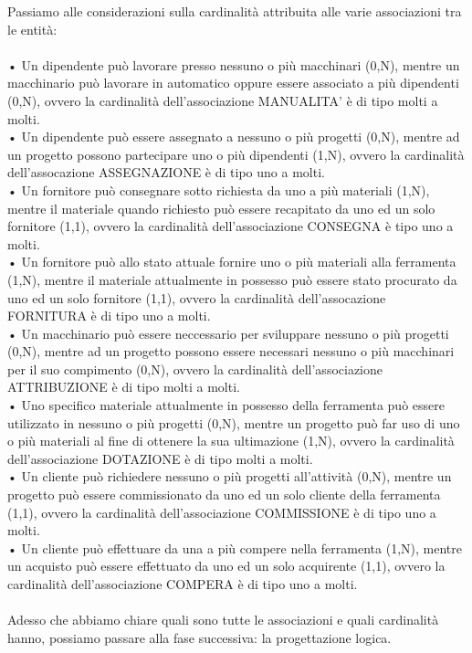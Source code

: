 \documentclass[a4paper,12pt,italian]{article}
\begin{document}
Passiamo alle considerazioni sulla cardinalità attribuita alle varie associazioni tra le entità:  \\ \\
• Un dipendente può lavorare presso nessuno o più macchinari (0,N), mentre un macchinario può lavorare in automatico oppure essere associato a più dipendenti (0,N), ovvero la cardinalità dell'associazione MANUALITA' è di tipo molti a molti. \\
• Un dipendente può essere assegnato a nessuno o più progetti (0,N), mentre ad un progetto possono partecipare uno o più dipendenti (1,N), ovvero la cardinalità dell'assocazione ASSEGNAZIONE è di tipo uno a molti. \\
• Un fornitore può consegnare sotto richiesta da uno a più materiali (1,N), mentre il materiale quando richiesto può essere recapitato da uno ed un solo fornitore (1,1), ovvero la cardinalità dell'associazione CONSEGNA è tipo uno a molti. \\
• Un fornitore può allo stato attuale fornire uno o più materiali alla ferramenta (1,N), mentre il materiale attualmente in possesso può essere stato procurato da uno ed un solo fornitore (1,1), ovvero la cardinalità dell'assocazione FORNITURA è di tipo uno a molti. \\
• Un macchinario può essere neccessario per sviluppare nessuno o più progetti (0,N), mentre ad un progetto possono essere necessari nessuno o più macchinari per il suo compimento (0,N), ovvero la cardinalità dell'associazione ATTRIBUZIONE è di tipo molti a molti. \\
• Uno specifico materiale attualmente in possesso della ferramenta può essere utilizzato in nessuno o più progetti (0,N), mentre un progetto può far uso di uno o più materiali al fine di ottenere la sua ultimazione (1,N), ovvero la cardinalità dell'associazione DOTAZIONE è di tipo molti a molti. \\
• Un cliente può richiedere nessuno o più progetti all'attività (0,N), mentre un progetto può essere commissionato da uno ed un solo cliente della ferramenta (1,1), ovvero la cardinalità dell'associazione COMMISSIONE è di tipo uno a molti. \\
• Un cliente può effettuare da una a più compere nella ferramenta (1,N), mentre un acquisto può essere effettuato da uno ed un solo acquirente (1,1), ovvero la cardinalità dell'associazione COMPERA è di tipo uno a molti. \\ \\
Adesso che abbiamo chiare quali sono tutte le associazioni e quali cardinalità hanno, possiamo passare alla fase successiva: la progettazione logica.
\end{document}
